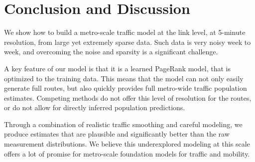 \documentclass[sigconf, review]{acmart}
\begin{document}
\section{Conclusion and Discussion}
\label{sec:conclude}

We show how to build a metro-scale traffic model at the link level, at 5-minute resolution, from large yet extremely sparse data.  Such data is very noisy week to week, and overcoming the noise and sparsity is a significant challenge.  

A key feature of our model is that it is a learned PageRank model, that is optimized to the training data.  
This means that the model can not only easily generate full routes, but also quickly provides full metro-wide traffic population estimates.  Competing methods do not offer this level of resolution for the routes, or do not allow for directly inferred population predictions.  

Through a combination of realistic traffic smoothing and careful modeling, we produce estimates that are plausible and significantly better than the raw measurement distributions.  We believe this underexplored modeling at this scale offers a lot of promise for metro-scale foundation models for traffic and mobility.  






\end{document}
